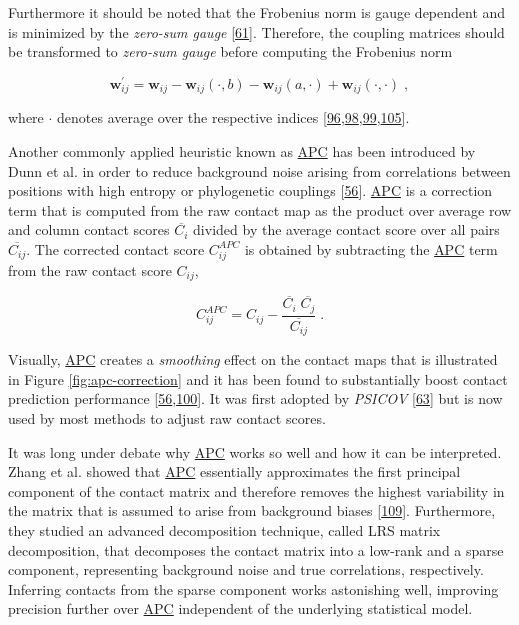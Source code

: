 \documentclass[11pt,a4paper,twoside]{book}
\newcommand{\w}{\mathbf{w}}
\newcommand{\wij}{\mathbf{w}_{ij}}
\theoremstyle{definition}
\theoremstyle{definition}
\theoremstyle{remark}
\begin{document}
Furthermore it should be noted that the Frobenius norm is gauge
dependent and is minimized by the \emph{zero-sum gauge}
{[}\protect\hyperlink{ref-Weigt2009}{61}{]}. Therefore, the coupling
matrices should be transformed to \emph{zero-sum gauge} before computing
the Frobenius norm

\begin{equation}
    \w^{\prime}_{ij}  = \wij - \wij(\cdot, b) - \wij(a, \cdot) + \wij(\cdot, \cdot) \; ,
\label{eq:zero-sum-gauge-transform}
\end{equation}

where \(\cdot\) denotes average over the respective indices
{[}\protect\hyperlink{ref-Ekeberg2013}{96},\protect\hyperlink{ref-Seemayer2014}{98},\protect\hyperlink{ref-Ekeberg2014}{99},\protect\hyperlink{ref-Baldassi2014}{105}{]}.

Another commonly applied heuristic known as
\protect\hyperlink{abbrev}{APC} has been introduced by Dunn et al. in
order to reduce background noise arising from correlations between
positions with high entropy or phylogenetic couplings
{[}\protect\hyperlink{ref-Dunn2008}{56}{]}.
\protect\hyperlink{abbrev}{APC} is a correction term that is computed
from the raw contact map as the product over average row and column
contact scores \(\overline{C_i}\) divided by the average contact score
over all pairs \(\overline{C_{ij}}\). The corrected contact score
\(C_{ij}^{APC}\) is obtained by subtracting the
\protect\hyperlink{abbrev}{APC} term from the raw contact score
\(C_{ij}\),

\begin{equation}
    C_{ij}^{APC}  = C_{ij} - \frac{\overline{C_i} \; \overline{C_j}}{\overline{C_{ij}}}\; .
\label{eq:apc}
\end{equation}

Visually, \protect\hyperlink{abbrev}{APC} creates a \emph{smoothing}
effect on the contact maps that is illustrated in Figure
\ref{fig:apc-correction} and it has been found to substantially boost
contact prediction performance
{[}\protect\hyperlink{ref-Dunn2008}{56},\protect\hyperlink{ref-Kamisetty2013}{100}{]}.
It was first adopted by \emph{PSICOV}
{[}\protect\hyperlink{ref-Jones2012}{63}{]} but is now used by most
methods to adjust raw contact scores.

It was long under debate why \protect\hyperlink{abbrev}{APC} works so
well and how it can be interpreted. Zhang et al. showed that
\protect\hyperlink{abbrev}{APC} essentially approximates the first
principal component of the contact matrix and therefore removes the
highest variability in the matrix that is assumed to arise from
background biases {[}\protect\hyperlink{ref-Zhang2016}{109}{]}.
Furthermore, they studied an advanced decomposition technique, called
LRS matrix decomposition, that decomposes the contact matrix into a
low-rank and a sparse component, representing background noise and true
correlations, respectively.\\
Inferring contacts from the sparse component works astonishing well,
improving precision further over \protect\hyperlink{abbrev}{APC}
independent of the underlying statistical model.
\end{document}
